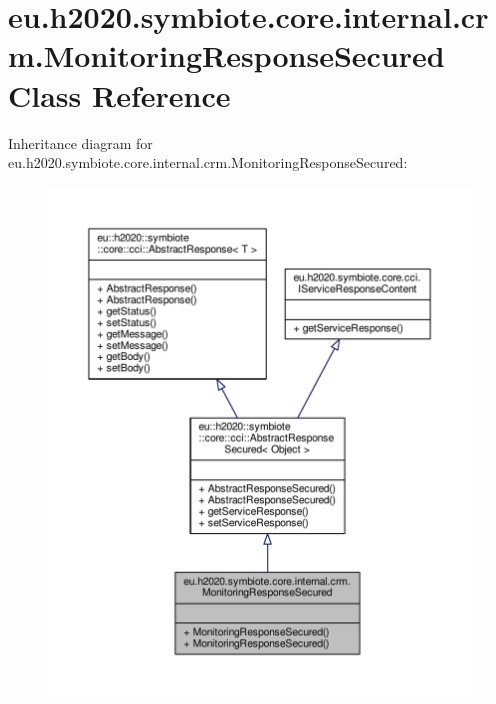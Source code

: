 \hypertarget{classeu_1_1h2020_1_1symbiote_1_1core_1_1internal_1_1crm_1_1MonitoringResponseSecured}{}\section{eu.\+h2020.\+symbiote.\+core.\+internal.\+crm.\+Monitoring\+Response\+Secured Class Reference}
\label{classeu_1_1h2020_1_1symbiote_1_1core_1_1internal_1_1crm_1_1MonitoringResponseSecured}


Inheritance diagram for eu.\+h2020.\+symbiote.\+core.\+internal.\+crm.\+Monitoring\+Response\+Secured\+:\nopagebreak
\begin{figure}[H]
\begin{center}
\leavevmode
\includegraphics[width=350pt]{classeu_1_1h2020_1_1symbiote_1_1core_1_1internal_1_1crm_1_1MonitoringResponseSecured__inherit__graph}
\end{center}
\end{figure}


